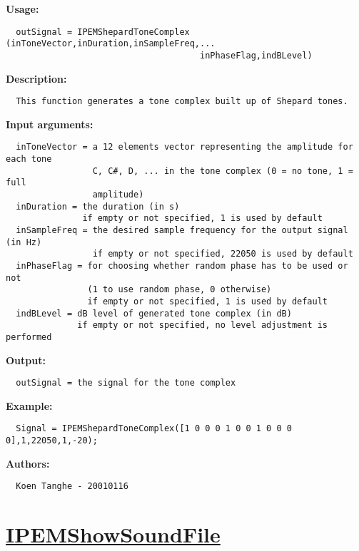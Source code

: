 \textbf{Usage:}
\begin{verbatim}  outSignal = IPEMShepardToneComplex (inToneVector,inDuration,inSampleFreq,...
                                      inPhaseFlag,indBLevel)

\end{verbatim}
\textbf{Description:}
\begin{verbatim}  This function generates a tone complex built up of Shepard tones.

\end{verbatim}
\textbf{Input arguments:}
\begin{verbatim}  inToneVector = a 12 elements vector representing the amplitude for each tone
                 C, C#, D, ... in the tone complex (0 = no tone, 1 = full
                 amplitude)
  inDuration = the duration (in s)
               if empty or not specified, 1 is used by default
  inSampleFreq = the desired sample frequency for the output signal (in Hz)
                 if empty or not specified, 22050 is used by default
  inPhaseFlag = for choosing whether random phase has to be used or not
                (1 to use random phase, 0 otherwise)
                if empty or not specified, 1 is used by default
  indBLevel = dB level of generated tone complex (in dB)
              if empty or not specified, no level adjustment is performed

\end{verbatim}
\textbf{Output:}
\begin{verbatim}  outSignal = the signal for the tone complex

\end{verbatim}
\textbf{Example:}
\begin{verbatim}  Signal = IPEMShepardToneComplex([1 0 0 0 1 0 0 1 0 0 0 0],1,22050,1,-20);

\end{verbatim}
\textbf{Authors:}
\begin{verbatim}  Koen Tanghe - 20010116
\end{verbatim}


\newpage
\section*{\hyperlink{Concepts:IPEMShowSoundFile}{IPEMShowSoundFile}}
\hypertarget{FuncRef:IPEMShowSoundFile}{}

